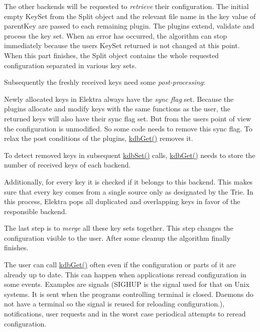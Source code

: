 The other backends will be requested to {\itshape retrieve} their configuration. The initial empty {\ttfamily Key\+Set} from the {\ttfamily Split} object and the relevant file name in the key value of {\ttfamily parent\+Key} are passed to each remaining plugin. The plugins extend, validate and process the key set. When an error has occurred, the algorithm can stop immediately because the user\textquotesingle{}s {\ttfamily Key\+Set} {\ttfamily returned} is not changed at this point. When this part finishes, the {\ttfamily Split} object contains the whole requested configuration separated in various key sets.

Subsequently the freshly received keys need some {\itshape post-\/processing}\+:


\begin{DoxyItemize}
\item Newly allocated keys in Elektra always have the {\itshape sync flag} set. Because the plugins allocate and modify keys with the same functions as the user, the returned keys will also have their sync flag set. But from the user\textquotesingle{}s point of view the configuration is unmodified. So some code needs to remove this sync flag. To relax the post conditions of the plugins, {\ttfamily \mbox{\hyperlink{group__kdb_ga28e385fd9cb7ccfe0b2f1ed2f62453a1}{kdb\+Get()}}} removes it.
\item To detect removed keys in subsequent {\ttfamily \mbox{\hyperlink{group__kdb_ga11436b058408f83d303ca5e996832bcf}{kdb\+Set()}}} calls, {\ttfamily \mbox{\hyperlink{group__kdb_ga28e385fd9cb7ccfe0b2f1ed2f62453a1}{kdb\+Get()}}} needs to store the number of received keys of each backend.
\item Additionally, for every key it is checked if it belongs to this backend. This makes sure that every key comes from a single source only as designated by the {\ttfamily Trie}. In this process, Elektra pops all duplicated and overlapping keys in favor of the responsible backend.
\end{DoxyItemize}

The last step is to {\itshape merge} all these key sets together. This step changes the configuration visible to the user. After some cleanup the algorithm finally finishes.

The user can call {\ttfamily \mbox{\hyperlink{group__kdb_ga28e385fd9cb7ccfe0b2f1ed2f62453a1}{kdb\+Get()}}} often even if the configuration or parts of it are already up to date. This can happen when applications reread configuration in some events. Examples are signals (S\+I\+G\+H\+UP is the signal used for that on Unix systems. It is sent when the program\textquotesingle{}s controlling terminal is closed. Daemons do not have a terminal so the signal is reused for reloading configuration.), notifications, user requests and in the worst case periodical attempts to reread configuration.

